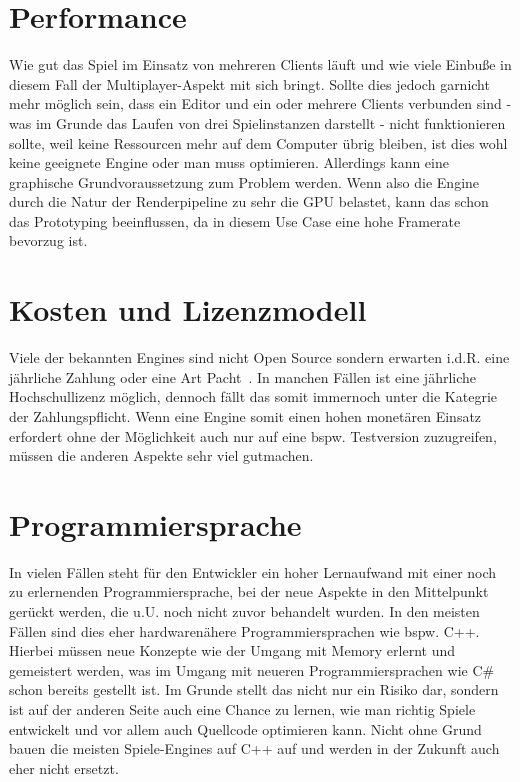 \section{Performance}
Wie gut das Spiel im Einsatz von mehreren Clients läuft und wie viele Einbuße in diesem Fall der Multiplayer-Aspekt mit sich bringt. Sollte dies jedoch garnicht mehr möglich sein, dass ein Editor und ein oder mehrere Clients verbunden sind - was im Grunde das Laufen von drei Spielinstanzen darstellt - nicht funktionieren sollte, weil keine Ressourcen mehr auf dem Computer übrig bleiben, ist dies wohl keine geeignete Engine oder man muss optimieren. 
Allerdings kann eine graphische Grundvoraussetzung zum Problem werden. Wenn also die Engine durch die Natur der Renderpipeline zu sehr die GPU belastet, kann das schon das Prototyping beeinflussen, da in diesem Use Case eine hohe Framerate bevorzug ist.

\section{Kosten und Lizenzmodell}
Viele der bekannten Engines sind nicht Open Source sondern erwarten i.d.R. eine jährliche Zahlung oder eine Art Pacht~. In manchen Fällen ist eine jährliche Hochschullizenz möglich, dennoch fällt das somit immernoch unter die Kategrie der Zahlungspflicht. 
Wenn eine Engine somit einen hohen monetären Einsatz erfordert ohne der Möglichkeit auch nur auf eine bspw. Testversion zuzugreifen, müssen die anderen Aspekte sehr viel gutmachen.

\section{Programmiersprache}
In vielen Fällen steht für den Entwickler ein hoher Lernaufwand mit einer noch zu erlernenden Programmiersprache, bei der neue Aspekte in den Mittelpunkt gerückt werden, die u.U. noch nicht zuvor behandelt wurden. In den meisten Fällen sind dies eher hardwarenähere Programmiersprachen wie bspw. C++. Hierbei müssen neue Konzepte wie der Umgang mit Memory erlernt und gemeistert werden, was im Umgang mit neueren Programmiersprachen wie C\# schon bereits gestellt ist. 
Im Grunde stellt das nicht nur ein Risiko dar, sondern ist auf der anderen Seite auch eine Chance zu lernen, wie man richtig Spiele entwickelt und vor allem auch Quellcode optimieren kann. Nicht ohne Grund bauen die meisten Spiele-Engines auf C++ auf und werden in der Zukunft auch eher nicht ersetzt.  

